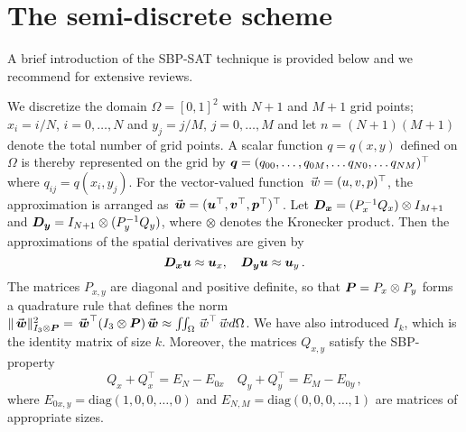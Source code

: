 \section{The semi-discrete scheme}\label{sec:semi_discrete}
A brief introduction of the SBP-SAT technique is provided below and we recommend \cite{fernandez2014review,svard2014review} for extensive reviews. 

We discretize the domain $\Omega = [0,1]^2$ with $N+1$ and $M+1$ grid points; $x_i = i/N$, $i = 0,\dots, N$ and $y_j = j/M$, $j= 0,\dots,M$ and let $n = (N+1)(M+1)$ denote the total number of grid points. A scalar function $q = q(x,y)$ defined on $\Omega$ is thereby represented on the grid by $\bm{q} = (q_{00}, \dots, q_{0M}, \dots q_{N0},\dots q_{NM})^\top$ where $q_{ij} = q(x_i,y_j)$. For the vector-valued function $\vecs{w} = (u,v,p)^\top$, the approximation is arranged as $\wn = (\un^\top,\vn^\top,\pn^\top)^\top$.
Let $\bm{D_x} = (P^{-1}_x Q_x) \otimes I_{M+1}$ and $\bm{D_y} = I_{N+1} \otimes (P^{-1}_y Q_y)$, where $\otimes$ denotes the Kronecker product. Then the approximations of the spatial derivatives are given by 
\[
  \bm{D_x} \bm{u} \approx \bm{u}_x,
  \quad 
  \bm{D_y} \bm{u} \approx \bm{u}_y
  \, .
\]
The matrices $P_{x,y}$ are diagonal and positive definite, so that $\bm{P} = P_x\otimes P_y$ forms a quadrature rule that defines the norm $\|\wn\|^2_{I_3\otimes\Pn} = \wn^\top (I_3\otimes\Pn) \wn \approx \iint_\Omega \vecs{w}^\top \vecs{w} d\Omega$. We have also introduced $I_{k}$, which is the identity matrix of size $k$. Moreover, the matrices $Q_{x,y}$ satisfy the SBP-property 
\begin{equation}
  Q_{x} + Q_{x}^\top = E_N - E_{0x}
  \quad 
  Q_{y} + Q_{y}^\top = E_M - E_{0y}
  \, ,
  \label{eq:sbp_property}
\end{equation}
where $E_{0x,y} = \text{diag}(1,0,0, \dots,0)$ and $E_{N,M} = \text{diag}(0,0,0,\dots,1)$ are matrices of appropriate sizes.

